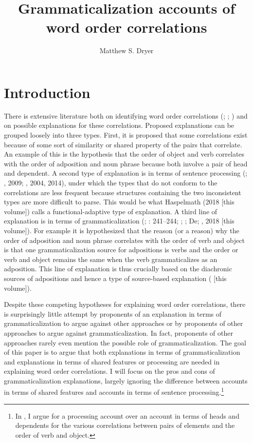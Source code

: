 \documentclass[output=paper]{langsci/langscibook}
\author{Matthew S. Dryer\affiliation{University at Buffalo}}
\title{Grammaticalization accounts of word order correlations}
\begin{document}
\maketitle 

\section{Introduction}

There is extensive literature both on identifying word order correlations (\citealt{Greenberg1963}; \citealt{Hawkins1983}; \citealt{Dryer1992}) and on possible explanations for these correlations. Proposed explanations can be grouped loosely into three types. First, it is proposed that some correlations exist because of some sort of similarity or shared property of the pairs that correlate. An example of this is the hypothesis that the order of object and verb correlates with the order of adposition and noun phrase because both involve a pair of head and dependent. A second type of explanation is in terms of sentence processing (\citealt{Kuno1974}; \citealt{Dryer1992}, 2009; \citealt{Hawkins1994}, 2004, 2014), under which the types that do not conform to the correlations are less frequent because structures containing the two inconsistent types are more difficult to parse. This would be what Haspelmath (2018 [this volume]) calls a functional-adaptive type of explanation. A third line of explanation is in terms of grammaticalization (\citealt{Givón1979}; \citealt{HeineReh1984}: 241–244; \citealt{Bybee1988}; \citealt{Aristar1991}; De\citealt{Lancey1994}; \citealt{Collins2012}, 2018 [this volume]). For example it is hypothesized that the reason (or a reason) why the order of adposition and noun phrase correlates with the order of verb and object is that one grammaticalization source for adpositions is verbs and the order or verb and object remains the same when the verb grammaticalizes as an adposition. This line of explanation is thus crucially based on the diachronic sources of adpositions and hence a type of source-based explanation (\citealt{Cristofaro2018} [this volume]).

Despite these competing hypotheses for explaining word order correlations, there is surprisingly little attempt by proponents of an explanation in terms of grammaticalization to argue against other approaches or by proponents of other approaches to argue against grammaticalization. In fact, proponents of other approaches rarely even mention the possible role of grammaticalization. The goal of this paper is to argue that both explanations in terms of grammaticalization and explanations in terms of shared features or processing are needed in explaining word order correlations. I will focus on the pros and cons of grammaticalization explanations, largely ignoring the difference between accounts in terms of shared features and accounts in terms of sentence processing.\footnote{In \citet{Dryer1992}, I argue for a processing account over an account in terms of heads and dependents for the various correlations between pairs of elements and the order of verb and object.}
\end{document}
